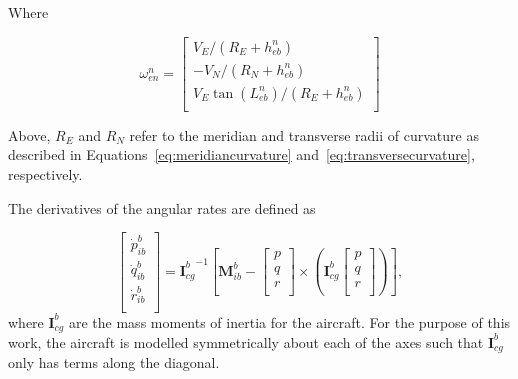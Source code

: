 Where

\begin{equation}\label{eq:omega_en_n}
    \omega_{en}^n =
    \begin{bmatrix}
        V_E/(R_E + h_{eb}^n)               \\
        -V_N/(R_N + h_{eb}^n)              \\
        V_E\tan(L_{eb}^n)/(R_E + h_{eb}^n) \\
    \end{bmatrix}
\end{equation}

Above, \(R_E\) and \(R_N\) refer to the meridian and transverse radii of curvature as described in Equations~\ref{eq:meridiancurvature} and~\ref{eq:transversecurvature}, respectively.

The derivatives of the angular rates are defined as

\begin{equation}\label{eq:angacc}
    \begin{bmatrix}
        \dot{p}_{ib}^b \\
        \dot{q}_{ib}^b \\
        \dot{r}_{ib}^b \\
    \end{bmatrix} =
    {\mathbf{I}_{cg}^b}^{-1}\left[\mathbf{M}_{ib}^b -
        \begin{bmatrix}
            p \\
            q \\
            r \\
        \end{bmatrix} \times
        \left(\mathbf{I}_{cg}^b
        \begin{bmatrix}
            p \\
            q \\
            r \\
        \end{bmatrix}
        \right)
        \right],
\end{equation}
where \(\mathbf{I}_{cg}^b\) are the mass moments of inertia for the aircraft. For the purpose of this work, the aircraft is modelled symmetrically about each of the axes such that \(\mathbf{I}_{cg}^b\) only has terms along the diagonal.


